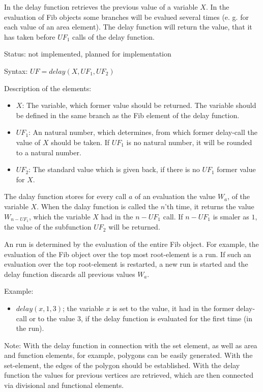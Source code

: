 In the delay function retrieves the previous value of a variable $X$. In the evaluation of Fib objects some branches will be evalued several times (e. g. for each value of an area element). The delay function will return the value, that it has taken before $UF_1$ calls of the delay function.

\bigskip\noindent
Status: not implemented, planned for implementation

\bigskip\noindent
Syntax:
$UF=delay( X, UF_1, UF_2 )$

\bigskip\noindent
Description of the elements:
\begin{itemize}
 \item $X$: The variable, which former value should be returned. The variable should be defined in the same branch as the Fib element of the delay function.
 \item $UF_1$: An natural number, which determines, from which former delay-call the value of $X$ should be taken. If $UF_1$ is no natural number, it will be rounded to a natural number.
 \item $UF_2$: The standard value which is given back, if there is no $UF_1$ former value for $X$.
\end{itemize}
The dalay function stores for every call $a$ of an evaluation the value $W_a$, of the variable $X$. When the dalay function is called the $n$'th time, it returns the value $W_{n-UF_1}$, which the variable $X$ had in the $n-UF_1$ call. If $n-UF_1$ is smaler as $1$, the value of the subfunction $UF_2$ will be returned.

An run is determined by the evaluation of the entire Fib object. For example, the evaluation of the Fib object over the top most root-element is a run. If such an evaluation over the top root-element is restarted, a new run is started and the delay function discards all previous values $W_a$.

\bigskip\noindent
Example:
\begin{itemize}
 \item $delay(x, 1, 3)$; the variable $x$ is set to the value, it had in the former delay-call or to the value $3$, if the delay function is evaluated for the first time (in the run).
\end{itemize}

\bigskip\noindent
Note:
With the delay function in connection with the set element, as well as area and function elements, for example, polygons can be easily generated. With the set-element, the edges of the polygon should be established. With the delay function the values for previous vertices are retrieved, which are then connected via divisional and functional elements.


